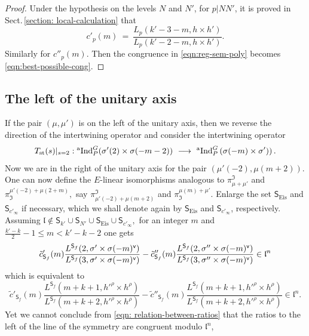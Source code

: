 \documentclass[11pt]{amsart}
\newcommand{\aInd}{{}^{\rm a}{\rm Ind}}
\newcommand{\sfv}{{\sf v}}
\begin{document}
\begin{proof}
Under the hypothesis on the levels $N$ and $N'$, for $p | NN'$, it is proved in Sect.\,\ref{section: local-calculation} that 
$$
		c'_p(m) \ = \ \frac{L_p(k'-3-m, h\times h' )}{L_p(k'-2-m, h \times h' )}.
$$
Similarly for $c''_p(m).$ Then the congruence in \eqref{eqn:reg-sem-poly} becomes \eqref{eqn:best-possible-cong}. 
\end{proof}


\medskip
\subsection{The left of the unitary axis}
\label{subsection: left-of-unitary-axis}
If the pair $(\mu, \mu')$ is on the left of the unitary axis, then we reverse the direction of the intertwining operator and consider the intertwining operator
$$
T_{\rm st}(s)|_{s = 2} : \aInd_P^G({}\sigma'(2) \times {}\sigma(-m-2)) \ \longrightarrow
 \ \aInd_P^G\left({}\sigma(-m) \times {}\sigma')\right). 
$$
Now we are in the right of the unitary axis for the pair $(\mu'(-2),\mu(m+2)).$ One can now define the $E$-linear isomorphisms analogous to
$\pi_{\mu+\mu'}^\mathfrak{I}$ and $\pi_{\mathfrak{I}}^{\mu'(-2) + \mu(2+m)},$ say $\pi^{\mathfrak{I}}_{\mu'(-2)+\mu(m+2)}$ and 
$\pi_{\mathfrak{I}}^{\mu(m) + \mu'}.$ Enlarge the set $\mathsf{S}_{\text{Eis}}$ and $\mathsf{S}_{c'_\infty}$ if necessary, 
which we shall denote again by $\mathsf{S}_{\text{Eis}}$ and $\mathsf{S}_{c'_\infty}$, respectively.
Assuming $\mathfrak{l} \not\in \mathsf{S}_{k'} \cup \mathsf{S}_{N'} \cup \mathsf{S}_{\text{Eis}} \cup \mathsf{S}_{c'_\infty},$ 
for an integer $m$ and $\frac{k'-k}{2} - 1 \leq m < k'-k-2$ one gets 
\begin{equation*}
	\tilde{c}'_{\mathsf{S}_f}(m)\dfrac{L^{\mathsf{S}_f}(2, \sigma' \times \sigma(-m)^\sfv)}
	{L^{\mathsf{S}_f}(3, \sigma' \times \sigma(-m)^\sfv)} - 
	\tilde{c}''_{\mathsf{S}_f}(m)\dfrac{L^{\mathsf{S}_f}(2, \sigma'' \times \sigma(-m)^\sfv)}
	{L^{\mathsf{S}_f}(3, \sigma'' \times \sigma(-m)^\sfv)} \in \mathfrak{l}^n
\end{equation*}
which is equivalent to 
\begin{equation*}
	\tilde{c}'_{\mathsf{S}_f}(m)\dfrac{L^{\mathsf{S}_f}(m+k+1, h'^\rho \times h^\rho)}
	{L^{\mathsf{S}_f}(m+k+2, h'^\rho \times h^\rho)} - 
	\tilde{c}''_{\mathsf{S}_f}(m)\dfrac{L^{\mathsf{S}_f}(m+k+1, h'^\rho \times h^\rho)}{L^{\mathsf{S}_f}(m+k+2, h'^\rho \times h^\rho)} \in \mathfrak{l}^n.
\end{equation*}
Yet we cannot conclude from \eqref{eqn: relation-between-ratios} that the ratios to the left of the line of the symmetry are congruent modulo $\mathfrak{l}^n$, 
\end{document}
